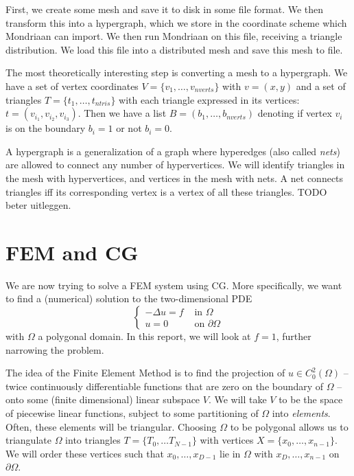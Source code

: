 \documentclass[11pt]{amsart}
\theoremstyle{definition}
\begin{document}
First, we create some mesh and save it to disk in some file format. We then transform this into a hypergraph, which we store in the coordinate scheme which Mondriaan can import. We then run Mondriaan on this file, receiving a triangle distribution. We load this file into a distributed mesh and save this mesh to file.

The most theoretically interesting step is converting a mesh to a hypergraph. We have a set of vertex coordinates $V = \{v_1, \ldots, v_{nverts}\}$ with $v = (x, y)$ and a set of triangles $T = \{ t_1, \ldots, t_{ntris}\}$ with each triangle expressed in its vertices: $t = (v_{i_1}, v_{i_2}, v_{i_3})$. Then we have a list $B = (b_1, \ldots, b_{nverts})$ denoting if vertex $v_i$ is on the boundary $b_i = 1$ or not $b_i = 0$.

A hypergraph is a generalization of a graph where hyperedges (also called \emph{nets}) are allowed to connect any number of hypervertices. We will identify triangles in the mesh with hypervertices, and vertices in the mesh with nets. A net connects triangles iff its corresponding vertex is a vertex of all these triangles. TODO beter uitleggen.

\section{FEM and CG}
We are now trying to solve a FEM system using CG. More specifically, we want to find a (numerical) solution to the two-dimensional PDE
\begin{equation}
  \label{eqn:fem}
  \begin{cases} -\Delta u = f & \text{ in } \Omega \\ u = 0 & \text{ on } \partial \Omega \end{cases}
\end{equation}
with $\Omega$ a polygonal domain. In this report, we will look at $f=1$, further narrowing the problem.

The idea of the Finite Element Method is to find the projection of $u \in C^2_0(\Omega)$ -- twice continuously differentiable functions that are zero on the boundary of $\Omega$ -- onto some (finite dimensional) linear subspace $V$. We will take $V$ to be the space of piecewise linear functions, subject to some partitioning of $\Omega$ into \emph{elements}. Often, these elements will be triangular. Choosing $\Omega$ to be polygonal allows us to triangulate $\Omega$ into triangles $T = \{ T_0, \ldots T_{N-1}\}$ with vertices $X = \{x_0, \ldots, x_{n-1}\}$. We will order these vertices such that $x_0, \ldots, x_{D-1}$ lie in $\Omega$ with $x_{D}, \ldots, x_{n-1}$ on $\partial \Omega$.
\end{document}
